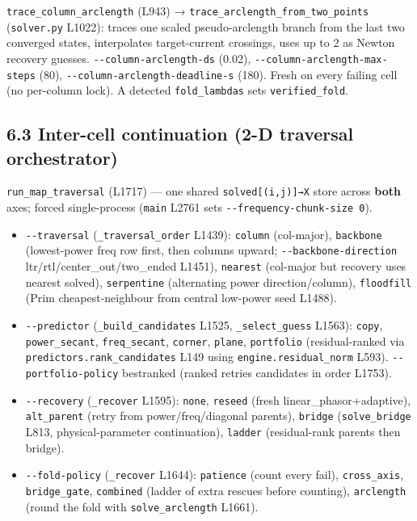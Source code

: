 \documentclass[
  10pt,
]{article}
\newcounter{none} %
\providecommand{\tightlist}{%
  \setlength{\itemsep}{0pt}\setlength{\parskip}{0pt}}
\begin{document}
\texttt{trace\_column\_arclength} (L943) →
\texttt{trace\_arclength\_from\_two\_points} (\texttt{solver.py} L1022):
traces one scaled pseudo-arclength branch from the last two converged
states, interpolates target-current crossings, uses up to 2 as Newton
recovery guesses. \texttt{-\/-column-arclength-ds} (0.02),
\texttt{-\/-column-arclength-max-steps} (80),
\texttt{-\/-column-arclength-deadline-s} (180). Fresh on every failing
cell (no per-column lock). A detected \texttt{fold\_lambdas} sets
\texttt{verified\_fold}.

\subsection{6.3 Inter-cell continuation (2-D traversal
orchestrator)}\label{inter-cell-continuation-2-d-traversal-orchestrator}

\texttt{run\_map\_traversal} (L1717) --- one shared
\texttt{solved{[}(i,j){]}→X} store across \textbf{both} axes; forced
single-process (\texttt{main} L2761 sets
\texttt{-\/-frequency-chunk-size\ 0}).

\begin{itemize}
\tightlist
\item
  \texttt{-\/-traversal} (\texttt{\_traversal\_order} L1439):
  \texttt{column} (col-major), \texttt{backbone} (lowest-power freq row
  first, then columns upward; \texttt{-\/-backbone-direction}
  ltr/rtl/center\_out/two\_ended L1451), \texttt{nearest} (col-major but
  recovery uses nearest solved), \texttt{serpentine} (alternating power
  direction/column), \texttt{floodfill} (Prim cheapest-neighbour from
  central low-power seed L1488).
\item
  \texttt{-\/-predictor} (\texttt{\_build\_candidates} L1525,
  \texttt{\_select\_guess} L1563): \texttt{copy},
  \texttt{power\_secant}, \texttt{freq\_secant}, \texttt{corner},
  \texttt{plane}, \texttt{portfolio} (residual-ranked via
  \texttt{predictors.rank\_candidates} L149 using
  \texttt{engine.residual\_norm} L593). \texttt{-\/-portfolio-policy}
  best\textbar ranked (ranked retries candidates in order L1753).
\item
  \texttt{-\/-recovery} (\texttt{\_recover} L1595): \texttt{none},
  \texttt{reseed} (fresh linear\_phasor+adaptive), \texttt{alt\_parent}
  (retry from power/freq/diagonal parents), \texttt{bridge}
  (\texttt{solve\_bridge} L813, physical-parameter continuation),
  \texttt{ladder} (residual-rank parents then bridge).
\item
  \texttt{-\/-fold-policy} (\texttt{\_recover} L1644): \texttt{patience}
  (count every fail), \texttt{cross\_axis}, \texttt{bridge\_gate},
  \texttt{combined} (ladder of extra rescues before counting),
  \texttt{arclength} (round the fold with \texttt{solve\_arclength}
  L1661).
\end{itemize}
\end{document}
